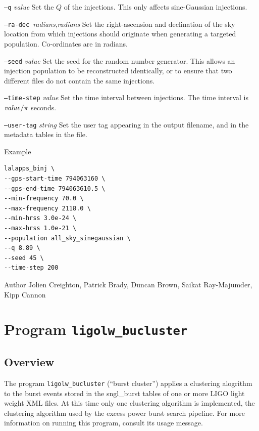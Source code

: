 \documentclass[10pt]{article}
\newcommand{\prog}[1]{\texttt{#1}}
\newcommand{\option}[1]{\texttt{#1}}
\newcommand{\parm}[1]{\textit{#1}}
\newenvironment{entry}%
{\begin{list}{}{\renewcommand{\makelabel}[1]%
{\parbox[b]{\labelwidth}{\makebox[0pt][l]{\textbf{##1}}\\}}%
\setlength{\labelwidth}{1em}%
\setlength{\labelsep}{1em}%
\setlength{\leftmargin}{2em}%
\setlength{\topsep}{\medskipamount}%
\setlength{\itemsep}{\medskipamount}%
\setlength{\parsep}{\medskipamount}%
\setlength{\listparindent}{0pt}}}
{\end{list}}
\begin{document}
\begin{entry}
\begin{entry}
\item[\option{--q} \parm{value}]
Set the \(Q\) of the injections.  This only affects sine-Gaussian
injections.

\item[\option{--ra-dec}~\parm{radians},\parm{radians}]
Set the right-ascension and declination of the sky location from which
injections should originate when generating a targeted population.
Co-ordinates are in radians.

\item[\option{--seed} \parm{value}]
Set the seed for the random number generator.  This allows an injection
population to be reconstructed identically, or to ensure that two different
files do not contain the same injections.

\item[\option{--time-step} \parm{value}]
Set the time interval between injections.  The time interval is
\(\text{\parm{value}} / \pi\) seconds.

\item[\option{--user-tag} \parm{string}]
Set the user tag appearing in the output filename, and in the metadata
tables in the file.

\end{entry}

\item[Example]
\begin{verbatim}
lalapps_binj \
--gps-start-time 794063160 \
--gps-end-time 794063610.5 \
--min-frequency 70.0 \
--max-frequency 2118.0 \
--min-hrss 3.0e-24 \
--max-hrss 1.0e-21 \
--population all_sky_sinegaussian \
--q 8.89 \
--seed 45 \
--time-step 200
\end{verbatim}

\item[Author] 
Jolien Creighton, Patrick Brady, Duncan Brown, Saikat Ray-Majumder, Kipp
Cannon
\end{entry}

 
\section{Program \prog{ligolw\_bucluster}}


\subsection{Overview}


The program \prog{ligolw\_bucluster} (``burst cluster'') applies a
clustering alogrithm to the burst events stored in the sngl\_burst tables
of one or more LIGO light weight XML files.  At this time only one
clustering algorithm is implemented, the clustering algorithm used by the
excess power burst search pipeline.  For more information on running this
program, consult its usage message.
\end{document}
